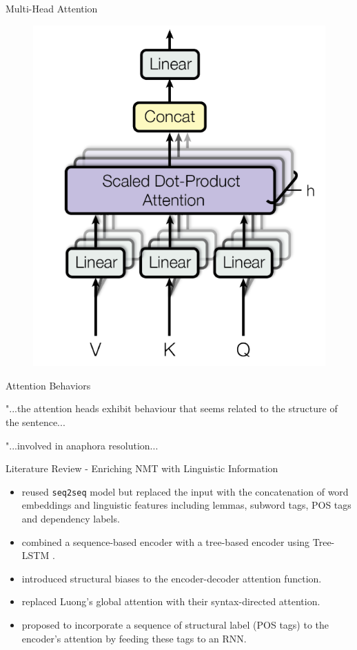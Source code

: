 \documentclass{beamer}
\def\seq2seq{\texttt{seq2seq}\xspace}
\begin{document}
\begin{frame}{Multi-Head Attention}
    \begin{figure}[t]
    \centering
    \includegraphics[width=0.5\linewidth]{img/multihead-attention.png}
    \end{figure}
\end{frame}


\begin{frame}{Attention Behaviors}
\begin{block}
"...the attention heads exhibit behaviour that seems related to the structure of the sentence...
\end{block}
\begin{block}
"...involved in anaphora resolution...
\end{block}
\end{frame}


\begin{frame}{Literature Review - Enriching NMT with Linguistic Information}
\begin{itemize}
    \item \cite{sennrich2016linguistic} reused \seq2seq model but replaced the input with the concatenation of word embeddings and linguistic features including lemmas, subword tags, POS tags and dependency labels.
    \item \cite{DBLP:conf/acl/EriguchiHT16} combined a sequence-based encoder with a tree-based encoder using Tree-LSTM \citep{DBLP:conf/acl/TaiSM15}.
    \item \cite{DBLP:conf/naacl/CohnHVYDH16} introduced structural biases to the encoder-decoder attention function.
    \item \cite{DBLP:journals/corr/abs-1711-04231} replaced Luong's global attention with their syntax-directed attention.
    \item \cite{DBLP:conf/acl/LiXTZZZ17} proposed to incorporate a sequence of structural label (POS tags) to the encoder's attention by feeding these tags to an RNN.
\end{itemize}
\end{frame}
\end{document}
